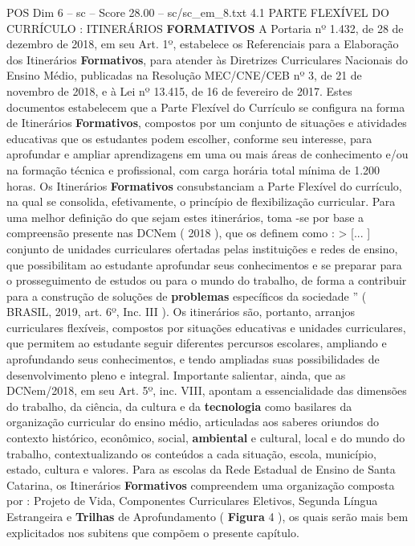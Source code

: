 \begin{textsample}{POS Dim 6 – sc – Score 28.00 – sc/sc\_em\_8.txt}  \label{ex:f6_pos_007}
4.1 PARTE FLEXÍVEL DO CURRÍCULO : ITINERÁRIOS \textbf{FORMATIVOS} A Portaria nº 1.432, de 28 de dezembro de 2018, em seu Art. 1º, estabelece os Referenciais para a Elaboração dos Itinerários \textbf{Formativos}, para atender às Diretrizes Curriculares Nacionais do Ensino Médio, publicadas na Resolução MEC/CNE/CEB nº 3, de 21 de novembro de 2018, e à Lei nº 13.415, de 16 de fevereiro de 2017.
Estes documentos estabelecem que a Parte Flexível do Currículo se configura na forma de Itinerários \textbf{Formativos}, compostos por um conjunto de situações e atividades educativas que os estudantes podem escolher, conforme seu interesse, para aprofundar e ampliar aprendizagens em uma ou mais áreas de conhecimento e/ou na formação técnica e profissional, com carga horária total mínima de 1.200 horas.
Os Itinerários \textbf{Formativos} consubstanciam a Parte Flexível do currículo, na qual se consolida, efetivamente, o princípio de flexibilização curricular.
Para uma melhor definição do que sejam estes itinerários, toma -se por base a compreensão presente nas DCNem ( 2018 ), que os definem como : > [... ] conjunto de unidades curriculares ofertadas pelas instituições e redes de ensino, que possibilitam ao estudante aprofundar seus conhecimentos e se preparar para o prosseguimento de estudos ou para o mundo do trabalho, de forma a contribuir para a construção de soluções de \textbf{problemas} específicos da sociedade ” ( BRASIL, 2019, art. 6º, Inc.
III ).
Os itinerários são, portanto, arranjos curriculares flexíveis, compostos por situações educativas e unidades curriculares, que permitem ao estudante seguir diferentes percursos escolares, ampliando e aprofundando seus conhecimentos, e tendo ampliadas suas possibilidades de desenvolvimento pleno e integral.
Importante salientar, ainda, que as DCNem/2018, em seu Art. 5º, inc.
VIII, apontam a essencialidade das dimensões do trabalho, da ciência, da cultura e da \textbf{tecnologia} como basilares da organização curricular do ensino médio, articuladas aos saberes oriundos do contexto histórico, econômico, social, \textbf{ambiental} e cultural, local e do mundo do trabalho, contextualizando os conteúdos a cada situação, escola, município, estado, cultura e valores.
Para as escolas da Rede Estadual de Ensino de Santa Catarina, os Itinerários \textbf{Formativos} compreendem uma organização composta por : Projeto de Vida, Componentes Curriculares Eletivos, Segunda Língua Estrangeira e \textbf{Trilhas} de Aprofundamento ( \textbf{Figura} 4 ), os quais serão mais bem explicitados nos subitens que compõem o presente capítulo.

\end{textsample}
